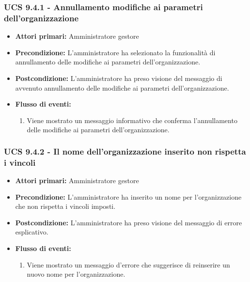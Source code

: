 \subsubsection{UCS 9.4.1 - Annullamento modifiche ai parametri dell'organizzazione}%
\begin{itemize}
\item \textbf{Attori primari:} Amministratore gestore
\item \textbf{Precondizione:} L'amministratore ha selezionato la funzionalità di annullamento delle modifiche ai parametri dell'organizzazione.
\item \textbf{Postcondizione:} L'amministratore ha preso visione del messaggio di avvenuto annullamento delle modifiche ai parametri dell'organizzazione.
\item \textbf{Flusso di eventi:}
    \begin{enumerate}
    \item Viene mostrato un messaggio informativo che conferma l'annullamento delle modifiche ai parametri dell'organizzazione.
    \end{enumerate} 
\end{itemize}

\subsubsection{UCS 9.4.2 - Il nome dell'organizzazione inserito non rispetta i vincoli}%
\begin{itemize}
\item \textbf{Attori primari:} Amministratore gestore
\item \textbf{Precondizione:} L'amministratore ha inserito un nome per l'organizzazione che non rispetta i vincoli imposti.
\item \textbf{Postcondizione:} L'amministratore ha preso visione del messaggio di errore esplicativo.
\item \textbf{Flusso di eventi:}
    \begin{enumerate}
    \item Viene mostrato un messaggio d'errore che suggerisce di reinserire un nuovo nome per l'organizzazione.
    \end{enumerate} 
\end{itemize}

